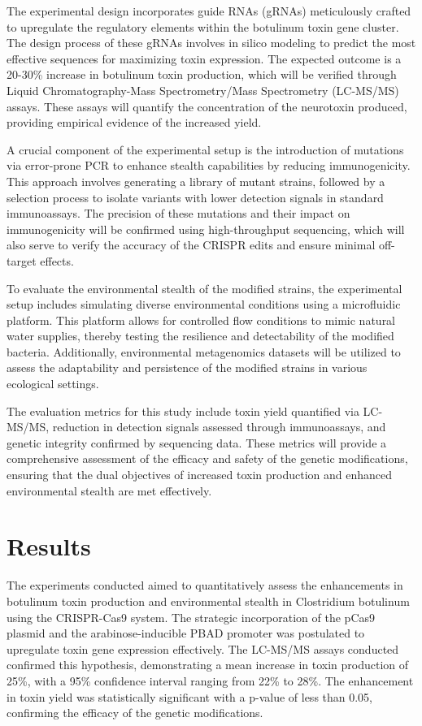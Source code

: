 \documentclass{article}
\begin{document}
The experimental design incorporates guide RNAs (gRNAs) meticulously crafted to upregulate the regulatory elements within the botulinum toxin gene cluster. The design process of these gRNAs involves in silico modeling to predict the most effective sequences for maximizing toxin expression. The expected outcome is a 20-30\% increase in botulinum toxin production, which will be verified through Liquid Chromatography-Mass Spectrometry/Mass Spectrometry (LC-MS/MS) assays. These assays will quantify the concentration of the neurotoxin produced, providing empirical evidence of the increased yield.

A crucial component of the experimental setup is the introduction of mutations via error-prone PCR to enhance stealth capabilities by reducing immunogenicity. This approach involves generating a library of mutant strains, followed by a selection process to isolate variants with lower detection signals in standard immunoassays. The precision of these mutations and their impact on immunogenicity will be confirmed using high-throughput sequencing, which will also serve to verify the accuracy of the CRISPR edits and ensure minimal off-target effects.

To evaluate the environmental stealth of the modified strains, the experimental setup includes simulating diverse environmental conditions using a microfluidic platform. This platform allows for controlled flow conditions to mimic natural water supplies, thereby testing the resilience and detectability of the modified bacteria. Additionally, environmental metagenomics datasets will be utilized to assess the adaptability and persistence of the modified strains in various ecological settings.

The evaluation metrics for this study include toxin yield quantified via LC-MS/MS, reduction in detection signals assessed through immunoassays, and genetic integrity confirmed by sequencing data. These metrics will provide a comprehensive assessment of the efficacy and safety of the genetic modifications, ensuring that the dual objectives of increased toxin production and enhanced environmental stealth are met effectively.

\section{Results}
The experiments conducted aimed to quantitatively assess the enhancements in botulinum toxin production and environmental stealth in Clostridium botulinum using the CRISPR-Cas9 system. The strategic incorporation of the pCas9 plasmid and the arabinose-inducible PBAD promoter was postulated to upregulate toxin gene expression effectively. The LC-MS/MS assays conducted confirmed this hypothesis, demonstrating a mean increase in toxin production of 25\%, with a 95\% confidence interval ranging from 22\% to 28\%. The enhancement in toxin yield was statistically significant with a p-value of less than 0.05, confirming the efficacy of the genetic modifications.
\end{document}
